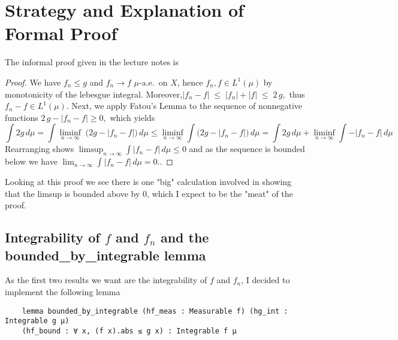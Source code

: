\documentclass{article}
\renewcommand{\texttt}[1]{{\small\ttfamily #1}}
\begin{document}
\section*{Strategy and Explanation of Formal Proof}

The informal proof given in the lecture notes is\\

\begin{adjustwidth}{1cm}{1cm}
\begin{proof}
We have $f_n \le g$ and $f_n \to f$ $\mu$-a.e.\ on $X$, hence $f_n, f \in L^1(\mu)$ by monotonicity of the lebesgue integral. Moreover,\( 
|f_n - f| \;\le\; |f_n| + |f| \;\le\; 2\,g,\)
thus $f_n - f \in L^1(\mu)$. Next, we apply Fatou's Lemma to the sequence of nonnegative functions \(2\,g - |f_n - f|\ge 0,\) which yields
\[
\int 2g \,d\mu
=\int \liminf_{n\to\infty}\; \bigl(2g - |f_n - f|\bigr)\,d\mu 
\le \liminf_{n\to\infty}\int \bigl(2g - |f_n - f|\bigr)\,d\mu = \int 2g \,d\mu + \liminf_{n\to\infty}\int - |f_n - f|\,d\mu
\]
Rearranging shows \(\limsup_{n\to\infty}\int |f_n - f|\,d\mu \le 0\)
and as the sequence is bounded below we have \( \lim_{n\to\infty}\int |f_n - f|\,d\mu = 0.\).
\end{proof}
\end{adjustwidth}

Looking at this proof we see there is one "big" calculation involved in showing that the limsup is bounded above by 0, which I expect to be the "meat" of the proof.

\subsection*{Integrability of $f$ and $f_n$ and the \texttt{bounded\_by\_integrable} lemma}

As the first two results we want are the integrability of $f$ and $f_n$, I decided to implement the following lemma

\begin{verbatim}
    lemma bounded_by_integrable (hf_meas : Measurable f) (hg_int : Integrable g μ)
    (hf_bound : ∀ x, (f x).abs ≤ g x) : Integrable f μ
\end{verbatim}
\end{document}
